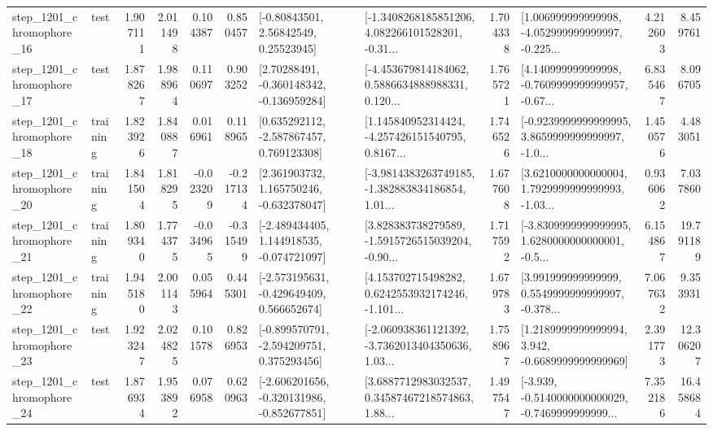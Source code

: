 \begin{tabular}{llrrrrllrlrr}
 step\_1201\_chromophore\_16 &      test &      1.907111 &    2.011498 &      0.104387 &  0.850457 &       [-0.80843501, 2.56842549, 0.25523945] &  [-1.3408268185851206, 4.082266101528201, -0.31... &       1.704338 &  [1.006999999999998, -4.052999999999997, -0.225... &            4.212603 &          8.459761 \\
 step\_1201\_chromophore\_17 &      test &      1.878267 &    1.988964 &      0.110697 &  0.903252 &    [2.70288491, -0.360148342, -0.136959284] &  [-4.453679814184062, 0.5886634888988331, 0.120... &       1.765721 &  [4.140999999999998, -0.7609999999999957, -0.67... &            6.835467 &          8.096705 \\
 step\_1201\_chromophore\_18 &  training &      1.823926 &    1.840887 &      0.016961 &  0.118965 &    [0.635292112, -2.587867457, 0.769123308] &  [1.145840952314424, -4.257426151540795, 0.8167... &       1.746526 &  [-0.9239999999999995, 3.8659999999999997, -1.0... &            1.450576 &          4.483051 \\
 step\_1201\_chromophore\_20 &  training &      1.841504 &    1.818295 &     -0.023209 & -0.217134 &    [2.361903732, 1.165750246, -0.632378047] &  [-3.9814383263749185, -1.382883834186854, 1.01... &       1.677608 &  [3.6210000000000004, 1.7929999999999993, -1.03... &            0.936062 &          7.037860 \\
 step\_1201\_chromophore\_21 &  training &      1.809340 &    1.774375 &     -0.034965 & -0.315499 &   [-2.489434405, 1.144918535, -0.074721097] &  [3.828383738279589, -1.5915726515039204, -0.90... &       1.717592 &  [-3.8309999999999995, 1.6280000000000001, -0.5... &            6.154867 &         19.791189 \\
 step\_1201\_chromophore\_22 &  training &      1.945180 &    2.001143 &      0.055964 &  0.445301 &   [-2.573195631, -0.429649409, 0.566652674] &  [4.153702715498282, 0.6242553932174246, -1.101... &       1.679783 &  [3.991999999999999, 0.5549999999999997, -0.378... &            7.067632 &          9.353931 \\
 step\_1201\_chromophore\_23 &      test &      1.923247 &    2.024825 &      0.101578 &  0.826953 &   [-0.899570791, -2.594209751, 0.375293456] &  [-2.060938361121392, -3.7362013404350636, 1.03... &       1.758967 &   [1.2189999999999994, 3.942, -0.6689999999999969] &            2.391773 &         12.306207 \\
 step\_1201\_chromophore\_24 &      test &      1.876934 &    1.953892 &      0.076958 &  0.620963 &  [-2.606201656, -0.320131986, -0.852677851] &  [3.6887712983032537, 0.34587467218574863, 1.88... &       1.497547 &  [-3.939, -0.5140000000000029, -0.7469999999999... &            7.352186 &         16.458684 \\

\end{tabular}
